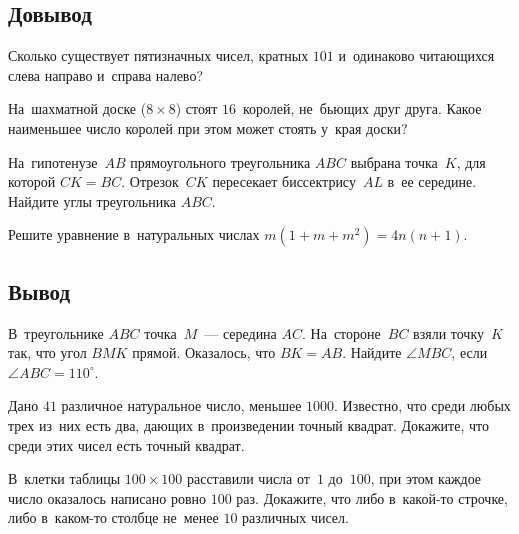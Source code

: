 

\subsection*{Довывод}

\begin{problems}

\item
Сколько существует пятизначных чисел, кратных $101$ и~одинаково читающихся
слева направо и~справа налево?

\item
На~шахматной доске ($8 \times 8$) стоят $16$~королей, не~бьющих друг друга.
Какое наименьшее число королей при этом может стоять у~края доски?

\item
На~гипотенузе~$AB$ прямоугольного треугольника $ABC$ выбрана точка~$K$, для
которой $CK = BC$.
Отрезок~$CK$ пересекает биссектрису~$AL$ в~ее середине.
Найдите углы треугольника $ABC$.

\item
Решите уравнение в~натуральных числах $m (1 + m + m^2) = 4 n (n + 1)$.

\end{problems}

\subsection*{Вывод}

\begin{problems}

\item
В~треугольнике $ABC$ точка~$M$~--- середина $AC$.
На~стороне~$BC$ взяли точку~$K$ так, что угол $BMK$ прямой.
Оказалось, что $BK = AB$.
Найдите $\angle MBC$, если $\angle ABC = 110^{\circ}$.

\item
Дано $41$ различное натуральное число, меньшее $1000$.
Известно, что среди любых трех из~них есть два, дающих в~произведении точный
квадрат.
Докажите, что среди этих чисел есть точный квадрат.

\item
В~клетки таблицы $100 \times 100$ расставили числа от~$1$ до~$100$, при этом
каждое число оказалось написано ровно $100$ раз.
Докажите, что либо в~какой-то строчке, либо в~каком-то столбце не~менее
$10$ различных чисел.

\end{problems}

